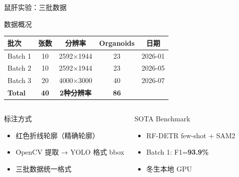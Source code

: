 \documentclass[aspectratio=169, 10pt]{beamer}
\begin{document}
\begin{frame}{鼠肝实验：三批数据}
  \begin{block}{数据概况}
    \begin{tabular}{lcccc}
      \toprule
      \textbf{批次} & \textbf{张数} & \textbf{分辨率} & \textbf{Organoids} & \textbf{日期} \\
      \midrule
      Batch 1 & 10 & 2592$\times$1944 & 23 & 2026-01 \\
      Batch 2 & 10 & 2592$\times$1944 & 23 & 2026-05 \\
      Batch 3 & 20 & 4000$\times$3000 & 40 & 2026-07 \\
      \midrule
      \textbf{Total} & \textbf{40} & \textbf{2种分辨率} & \textbf{86} & \\
      \bottomrule
    \end{tabular}
  \end{block}
  \vspace{0em}
  \begin{columns}[T]
    \begin{block}{标注方式}
      \begin{itemize}
        \item 红色折线轮廓（精确轮廓）
        \item OpenCV 提取 → YOLO 格式 bbox
        \item 三批数据统一格式
      \end{itemize}
    \end{block}
    \begin{alertblock}{SOTA Benchmark}
      \begin{itemize}
        \item RF-DETR few-shot + SAM2
        \item Batch 1: F1=\textbf{93.9\%}
        \item 冬生本地 GPU
      \end{itemize}
    \end{alertblock}
  \end{columns}
\end{frame}
\end{document}

